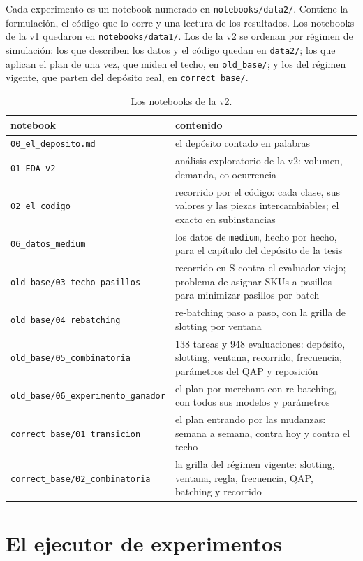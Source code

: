\documentclass[11pt,a4paper,oneside]{report}
\newcommand{\code}[1]{\texttt{\small #1}}
\begin{document}
Cada experimento es un notebook numerado en \code{notebooks/data2/}. Contiene la formulación,
el código que lo corre y una lectura de los resultados. Los notebooks de la v1 quedaron en
\code{notebooks/data1/}. Los de la v2 se ordenan por régimen de simulación: los que describen
los datos y el código quedan en \code{data2/}; los que aplican el plan de una vez, que miden el
techo, en \code{old\_base/}; y los del régimen vigente, que parten del depósito real, en
\code{correct\_base/}.

\begin{table}[ht]
\centering\small
\begin{tabularx}{\textwidth}{@{}l L@{}}
\toprule
notebook & contenido \\
\midrule
\code{00\_el\_deposito.md} & el depósito contado en palabras \\
\code{01\_EDA\_v2} & análisis exploratorio de la v2: volumen, demanda, co-ocurrencia \\
\code{02\_el\_codigo} & recorrido por el código: cada clase, sus valores y las piezas intercambiables; el exacto en subinstancias \\
\code{06\_datos\_medium} & los datos de \code{medium}, hecho por hecho, para el capítulo del depósito de la tesis \\
\midrule
\code{old\_base/03\_techo\_pasillos} & recorrido en S contra el evaluador viejo; problema de asignar SKUs a pasillos para minimizar pasillos por batch \\
\code{old\_base/04\_rebatching} & re-batching paso a paso, con la grilla de slotting por ventana \\
\code{old\_base/05\_combinatoria} & 138 tareas y 948 evaluaciones: depósito, slotting, ventana, recorrido, frecuencia, parámetros del QAP y reposición \\
\code{old\_base/06\_experimento\_ganador} & el plan por merchant con re-batching, con todos sus modelos y parámetros \\
\midrule
\code{correct\_base/01\_transicion} & el plan entrando por las mudanzas: semana a semana, contra hoy y contra el techo \\
\code{correct\_base/02\_combinatoria} & la grilla del régimen vigente: slotting, ventana, regla, frecuencia, QAP, batching y recorrido \\
\bottomrule
\end{tabularx}
\caption{Los notebooks de la v2.}
\end{table}

\section{El ejecutor de experimentos}
\end{document}
